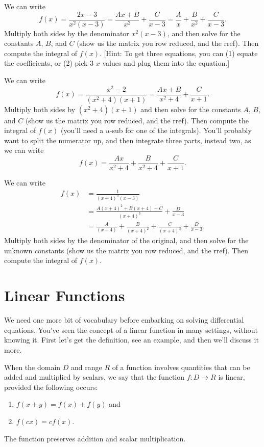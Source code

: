 \begin{problem}
We can write 
$$f(x)
=\frac{2x-3}{x^2(x-3)} 
= \frac{Ax+B}{x^2}+\frac{C}{x-3} 
= \frac{A}{x}+\frac{B}{x^2}+\frac{C}{x-3}.$$
Multiply both sides by the denominator $x^2(x-3)$, and then solve for the constants $A$, $B$, and $C$ (show us the matrix you row reduced, and the rref).   Then compute the integral of $f(x)$.  [Hint: To get three equations, you can (1) equate the coefficients, or (2) pick 3 $x$ values and plug them into the equation.]
\end{problem}

\begin{problem}
We can write 
$$f(x)
=\frac{x^2-2}{(x^2+4)(x+1)} 
= \frac{Ax+B}{x^2+4}+\frac{C}{x+1}. 
$$
Multiply both sides by $(x^2+4)(x+1)$ and then solve for the constants $A$, $B$, and $C$ (show us the matrix you row reduced, and the rref).   Then compute the integral of $f(x)$ (you'll need a $u$-sub for one of the integrals).  You'll probably want to split the numerator up, and then integrate three parts, instead two, as we can write
$$f(x)= \frac{Ax}{x^2+4}+ \frac{B}{x^2+4}+\frac{C}{x+1}.$$
\end{problem}

\begin{problem}
We can write 
\begin{align*}
f(x)
&=\frac{1}{(x+4)^3(x-3)}\\
&=\frac{A(x+4)^2+B(x+4)+C}{(x+4)^3}+\frac{D}{x-3} \\
&=
\frac{A}{(x+4)}
+\frac{B}{(x+4)^2}
+\frac{C}{(x+4)^3}
+\frac{D}{x-3} . 
\end{align*}
Multiply both sides by the denominator of the original, and then solve for the unknown constants (show us the matrix you row reduced, and the rref).  Then compute the integral of $f(x)$. 
\end{problem}





\section{Linear Functions}
We need one more bit of vocabulary before embarking on solving differential equations.  You've seen the concept of a linear function in many settings, without knowing it. First let's get the definition, see an example, and then we'll discuss it more.
\begin{definition}
 When the domain $D$ and range $R$ of a function involves quantities that can be added and multiplied by scalars, we say that the function $f:D\to R$ is linear, provided the following occurs:
\begin{enumerate}
 \item $f(x+y) = f(x)+f(y)$ and
 \item $f(cx)=cf(x)$. 
\end{enumerate}
The function preserves addition and scalar multiplication.
\end{definition}

